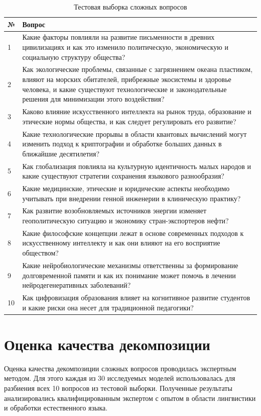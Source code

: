 \begin{table}[H]
	\caption{Тестовая выборка сложных вопросов}
	\label{tab:test-questions}
	\begin{tabular}{|p{0.5cm}|p{15.6cm}|}
		\hline
		\textbf{№} & \textbf{Вопрос} \\
		\hline
		1 & Какие факторы повлияли на развитие письменности в древних цивилизациях и как это изменило политическую, экономическую и социальную структуру общества? \\
		\hline
		2 & Как экологические проблемы, связанные с загрязнением океана пластиком, влияют на морских обитателей, прибрежные экосистемы и здоровье человека, и какие существуют технологические и законодательные решения для минимизации этого воздействия? \\
		\hline
		3 & Каково влияние искусственного интеллекта на рынок труда, образование и этические нормы общества, и как следует регулировать его развитие? \\
		\hline
		4 & Какие технологические прорывы в области квантовых вычислений могут изменить подход к криптографии и обработке больших данных в ближайшие десятилетия? \\
		\hline
		5 & Как глобализация повлияла на культурную идентичность малых народов и какие существуют стратегии сохранения языкового разнообразия? \\
		\hline
		6 & Какие медицинские, этические и юридические аспекты необходимо учитывать при внедрении генной инженерии в клиническую практику? \\
		\hline
		7 & Как развитие возобновляемых источников энергии изменяет геополитическую ситуацию и экономику стран-экспортеров нефти? \\
		\hline
		8 & Какие философские концепции лежат в основе современных подходов к искусственному интеллекту и как они влияют на его восприятие обществом? \\
		\hline
		9 & Какие нейробиологические механизмы ответственны за формирование долговременной памяти и как их понимание может помочь в лечении нейродегенеративных заболеваний? \\
		\hline
		10 & Как цифровизация образования влияет на когнитивное развитие студентов и какие риски она несет для традиционной педагогики? \\
		\hline
	\end{tabular}
\end{table}

\section{Оценка качества декомпозиции}
Оценка качества декомпозиции сложных вопросов проводилась экспертным методом. Для этого каждая из 30 исследуемых моделей использовалась для разбиения всех 10 вопросов из тестовой выборки. Полученные результаты анализировались квалифицированным экспертом с опытом в области лингвистики и обработки естественного языка.

